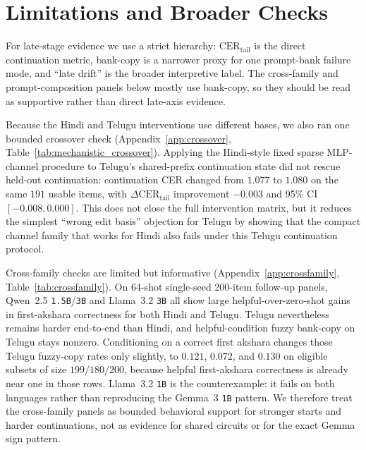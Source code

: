 \documentclass{article}
\begin{document}
\section{Limitations and Broader Checks}\label{sec:bounds}

For late-stage evidence we use a strict hierarchy: $\mathrm{CER}_{\mathrm{tail}}$ is the direct continuation metric, bank-copy is a narrower proxy for one prompt-bank failure mode, and ``late drift'' is the broader interpretive label. The cross-family and prompt-composition panels below mostly use bank-copy, so they should be read as supportive rather than direct late-axis evidence.

Because the Hindi and Telugu interventions use different bases, we also ran one bounded crossover check (Appendix~\ref{app:crossover}, Table~\ref{tab:mechanistic_crossover}). Applying the Hindi-style fixed sparse MLP-channel procedure to Telugu's shared-prefix continuation state did not rescue held-out continuation: continuation CER changed from $1.077$ to $1.080$ on the same $191$ usable items, with $\Delta\mathrm{CER}_{\mathrm{tail}}$ improvement $-0.003$ and 95\% CI $[-0.008,0.000]$. This does not close the full intervention matrix, but it reduces the simplest ``wrong edit basis'' objection for Telugu by showing that the compact channel family that works for Hindi also fails under this Telugu continuation protocol.

Cross-family checks are limited but informative (Appendix~\ref{app:crossfamily}, Table~\ref{tab:crossfamily}). On 64-shot single-seed 200-item follow-up panels, Qwen~2.5 \texttt{1.5B}/\texttt{3B} and Llama~3.2 \texttt{3B} all show large helpful-over-zero-shot gains in first-akshara correctness for both Hindi and Telugu. Telugu nevertheless remains harder end-to-end than Hindi, and helpful-condition fuzzy bank-copy on Telugu stays nonzero. Conditioning on a correct first akshara changes those Telugu fuzzy-copy rates only slightly, to $0.121$, $0.072$, and $0.130$ on eligible subsets of size $199/180/200$, because helpful first-akshara correctness is already near one in those rows. Llama~3.2 \texttt{1B} is the counterexample: it fails on both languages rather than reproducing the Gemma~3 \texttt{1B} pattern. We therefore treat the cross-family panels as bounded behavioral support for stronger starts and harder continuations, not as evidence for shared circuits or for the exact Gemma sign pattern.
\end{document}
